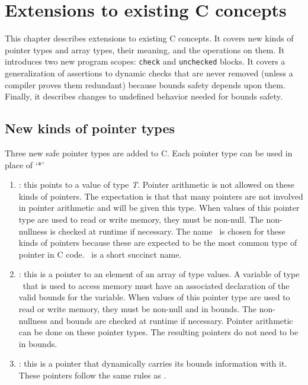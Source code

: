 
\chapter{Extensions to existing C concepts}
\label{chapter:core-extensions}

This chapter describes extensions to existing C concepts. 
It covers new kinds of pointer types and array types, their meaning,
and the operations  on them.   It introduces two
new program scopes: \texttt{check} and \texttt{unchecked}
blocks. It covers a generalization of assertions to 
dynamic checks that are never  removed (unless a compiler
proves them redundant) because bounds safety depends upon them. 
Finally, it describes changes to
undefined behavior needed for bounds safety.

\section{New kinds of pointer types}
Three new safe pointer types are added to C. Each pointer type can be
used in place of `*'

\begin{enumerate}
\item
  \ptrT: this points to
  a value of type \textit{T}. Pointer arithmetic is not allowed on these
  kinds of pointers. The expectation is that that many pointers are not
  involved in pointer arithmetic and will be given this type. When
  values of this pointer type are used to read or write memory, they
  must be non-null. The non-nullness is checked at runtime if necessary.
  The name \ptr\ is chosen for these kinds of pointers because these
  are expected to be the most common type of pointer in C code. \ptr\
  is a short succinct name.
\item
  \arrayptrT: this is
  a pointer to an element of an array of type  values. A
  variable of type \arrayptr\ that is used to access memory
  must have an associated declaration of the valid bounds for the
  variable. When values of this pointer type are used to read or write
  memory, they must be non-null and in bounds. The non-nullness and
  bounds are checked at runtime if necessary. Pointer arithmetic can be
  done on these pointer types. The resulting pointers do not need to be
  in bounds.
\item
  \arrayviewT: this
  is a pointer that dynamically carries its bounds information with it.
  These pointers follow the same rules as
  \arrayptrT .
\end{enumerate}


